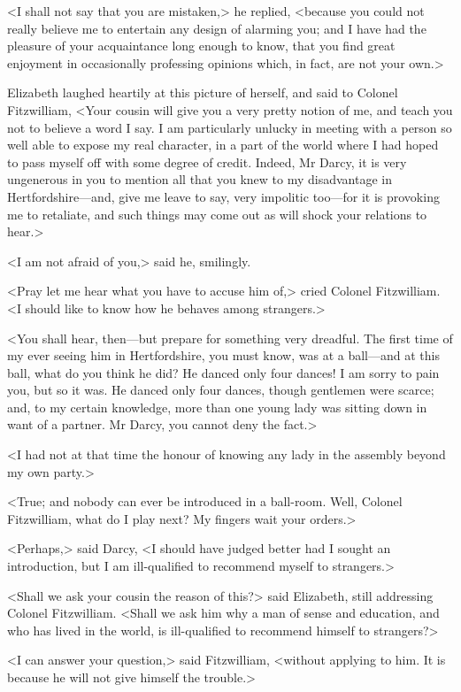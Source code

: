 <I shall not say that you are mistaken,> he replied, <because you could not really believe me to entertain any design of alarming you; and I have had the pleasure of your acquaintance long enough to know, that you find great enjoyment in occasionally professing opinions which, in fact, are not your own.>

Elizabeth laughed heartily at this picture of herself, and said to Colonel Fitzwilliam, <Your cousin will give you a very pretty notion of me, and teach you not to believe a word I say. I am particularly unlucky in meeting with a person so well able to expose my real character, in a part of the world where I had hoped to pass myself off with some degree of credit. Indeed, Mr Darcy, it is very ungenerous in you to mention all that you knew to my disadvantage in Hertfordshire—and, give me leave to say, very impolitic too—for it is provoking me to retaliate, and such things may come out as will shock your relations to hear.>

<I am not afraid of you,> said he, smilingly.

<Pray let me hear what you have to accuse him of,> cried Colonel Fitzwilliam. <I should like to know how he behaves among strangers.>

<You shall hear, then—but prepare for something very dreadful. The first time of my ever seeing him in Hertfordshire, you must know, was at a ball—and at this ball, what do you think he did? He danced only four dances! I am sorry to pain you, but so it was. He danced only four dances, though gentlemen were scarce; and, to my certain knowledge, more than one young lady was sitting down in want of a partner. Mr Darcy, you cannot deny the fact.>

<I had not at that time the honour of knowing any lady in the assembly beyond my own party.>

<True; and nobody can ever be introduced in a ball-room. Well, Colonel Fitzwilliam, what do I play next? My fingers wait your orders.>

<Perhaps,> said Darcy, <I should have judged better had I sought an introduction, but I am ill-qualified to recommend myself to strangers.>

<Shall we ask your cousin the reason of this?> said Elizabeth, still addressing Colonel Fitzwilliam. <Shall we ask him why a man of sense and education, and who has lived in the world, is ill-qualified to recommend himself to strangers?>

<I can answer your question,> said Fitzwilliam, <without applying to him. It is because he will not give himself the trouble.>

